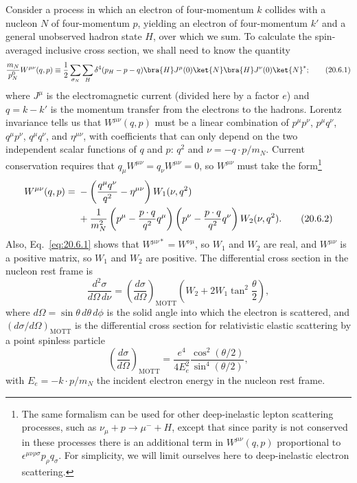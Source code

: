 Consider a process in which an electron of four-momentum $k$ collides with a nucleon $N$ of four-momentum $p$, yielding an electron of four-momentum $k'$ and a general unobserved hadron state $H$, over which we sum. To calculate the spin-averaged inclusive cross section, we shall need to know the quantity
\begin{equation}
\frac{m_N}{p_N^0}W^{\mu\nu}(q,p)
\equiv
\frac12\sum_{\sigma_N}\sum_H
\delta^4(p_H-p-q)
\bra{H}J^\mu(0)\ket{N}
\bra{H}J^\nu(0)\ket{N}^{*};
\tag{20.6.1}\label{eq:20.6.1}
\end{equation}
where $J^\mu$ is the electromagnetic current (divided here by a factor $e$) and $q=k-k'$ is the momentum transfer from the electrons to the hadrons. Lorentz invariance tells us that $W^{\mu\nu}(q,p)$ must be a linear combination of $p^\mu p^\nu$, $p^\mu q^\nu$, $q^\mu p^\nu$, $q^\mu q^\nu$, and $\eta^{\mu\nu}$, with coefficients that can only depend on the two independent scalar functions of $q$ and $p$: $q^2$ and $\nu=-q\cdot p/m_N$. Current conservation requires that $q_\mu W^{\mu\nu}=q_\nu W^{\mu\nu}=0$, so $W^{\mu\nu}$ must take the form\footnote{The same formalism can be used for other deep-inelastic lepton scattering processes, such as $\nu_\mu+p\to\mu^-+H$, except that since parity is not conserved in these processes there is an additional term in $W^{\mu\nu}(q,p)$ proportional to $\epsilon^{\mu\nu\rho\sigma}p_\rho q_\sigma$. For simplicity, we will limit ourselves here to deep-inelastic electron scattering.}
\begin{align}
W^{\mu\nu}(q,p)
={}&-\left(\frac{q^\mu q^\nu}{q^2}-\eta^{\mu\nu}\right)
W_1(\nu,q^2)
\notag\\
&+\frac{1}{m_N^2}
\left(p^\mu-\frac{p\cdot q}{q^2}q^\mu\right)
\left(p^\nu-\frac{p\cdot q}{q^2}q^\nu\right)
W_2(\nu,q^2).
\tag{20.6.2}\label{eq:20.6.2}
\end{align}
Also, Eq.~\eqref{eq:20.6.1} shows that $W^{\mu\nu *}=W^{\nu\mu}$, so $W_1$ and $W_2$ are real, and $W^{\mu\nu}$ is a positive matrix, so $W_1$ and $W_2$ are positive. The differential cross section in the nucleon rest frame is
\begin{equation}
\frac{d^2\sigma}{d\Omega\,d\nu}
=
\left(\frac{d\sigma}{d\Omega}\right)_{\mathrm{MOTT}}
\left(W_2+2W_1\tan^2\frac{\theta}{2}\right),
\tag{20.6.3}\label{eq:20.6.3}
\end{equation}
where $d\Omega=\sin\theta\,d\theta\,d\phi$ is the solid angle into which the electron is scattered, and $(d\sigma/d\Omega)_{\mathrm{MOTT}}$ is the differential cross section for relativistic elastic scattering by a point spinless particle
\begin{equation}
\left(\frac{d\sigma}{d\Omega}\right)_{\mathrm{MOTT}}
=
\frac{e^4}{4E_e^2}
\frac{\cos^2(\theta/2)}{\sin^4(\theta/2)},
\tag{20.6.4}\label{eq:20.6.4}
\end{equation}
with $E_e=-k\cdot p/m_N$ the incident electron energy in the nucleon rest frame.

